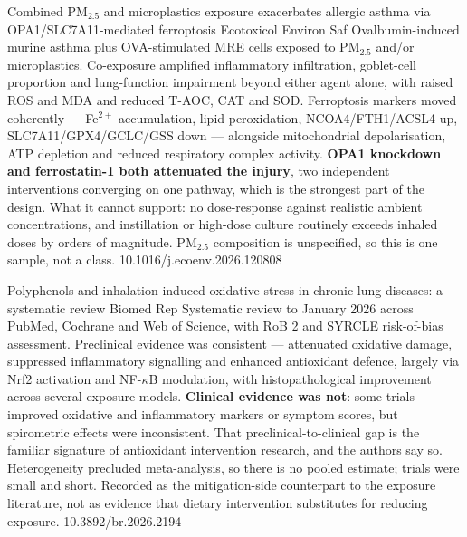 \documentclass[10pt]{article}
\begin{document}
{Combined PM$_{2.5}$ and microplastics exposure exacerbates allergic asthma via OPA1/SLC7A11-mediated ferroptosis}
{Ecotoxicol Environ Saf}
{Ovalbumin-induced murine asthma plus OVA-stimulated MRE cells exposed to PM$_{2.5}$ and/or
microplastics. Co-exposure amplified inflammatory infiltration, goblet-cell proportion and
lung-function impairment beyond either agent alone, with raised ROS and MDA and reduced
T-AOC, CAT and SOD. Ferroptosis markers moved coherently --- Fe$^{2+}$ accumulation, lipid
peroxidation, NCOA4/FTH1/ACSL4 up, SLC7A11/GPX4/GCLC/GSS down --- alongside mitochondrial
depolarisation, ATP depletion and reduced respiratory complex activity. \textbf{OPA1
knockdown and ferrostatin-1 both attenuated the injury}, two independent interventions
converging on one pathway, which is the strongest part of the design. What it cannot
support: no dose-response against realistic ambient concentrations, and instillation or
high-dose culture routinely exceeds inhaled doses by orders of magnitude. PM$_{2.5}$
composition is unspecified, so this is one sample, not a class.}
{10.1016/j.ecoenv.2026.120808}

{Polyphenols and inhalation-induced oxidative stress in chronic lung diseases: a systematic review}
{Biomed Rep}
{Systematic review to January 2026 across PubMed, Cochrane and Web of Science, with RoB 2
and SYRCLE risk-of-bias assessment. Preclinical evidence was consistent --- attenuated
oxidative damage, suppressed inflammatory signalling and enhanced antioxidant defence,
largely via Nrf2 activation and NF-$\kappa$B modulation, with histopathological improvement
across several exposure models. \textbf{Clinical evidence was not}: some trials improved
oxidative and inflammatory markers or symptom scores, but spirometric effects were
inconsistent. That preclinical-to-clinical gap is the familiar signature of antioxidant
intervention research, and the authors say so. Heterogeneity precluded meta-analysis, so
there is no pooled estimate; trials were small and short. Recorded as the mitigation-side
counterpart to the exposure literature, not as evidence that dietary intervention
substitutes for reducing exposure.}
{10.3892/br.2026.2194}


\clearpage

\end{document}
